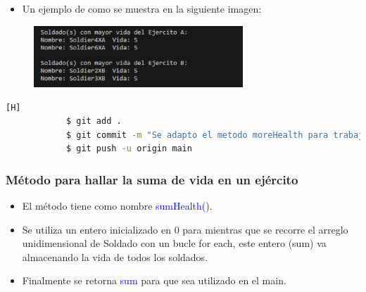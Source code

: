 \documentclass{article}
\begin{document}
        

        \begin{itemize}
            \begin{itemize}
                \item Un ejemplo de como se muestra en la siguiente imagen:
            \end{itemize}
        \end{itemize}

        \begin{figure}[H]
            \centering
            \includegraphics[width=0.7\textwidth,keepaspectratio]{img/moreHealth.png}
            \caption{}
        \end{figure}

        \begin{lstlisting}[language=bash,caption={Commit: Se agregó el método moreHealt() que imprimirá aquellos soldados que tengan la mayor vida dentro de su ejército}][H]
    		$ git add .
    		$ git commit -m "Se adapto el metodo moreHealth para trabajar con los ArrayList de soldados, este sera aplicado para cada ejercito"
    		$ git push -u origin main
    	\end{lstlisting}
        
        \newpage
        \subsubsection{Método para hallar la suma de vida en un ejército}

        \begin{itemize}
            \item El método tiene como nombre \textcolor{blue}{sumHealth()}.
            \item Se utiliza un entero inicializado en 0 para mientras que se recorre el arreglo unidimensional de Soldado con un bucle for each, este entero (sum) va almacenando la vida de todos los soldados.
            \item Finalmente se retorna \textcolor{blue}{sum} para que sea utilizado en el main.
        \end{itemize}
\end{document}

